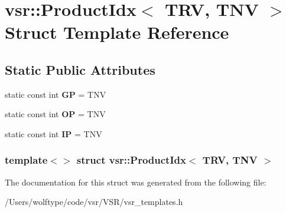\hypertarget{structvsr_1_1_product_idx_3_01_t_r_v_00_01_t_n_v_01_4}{\section{vsr\-:\-:Product\-Idx$<$ T\-R\-V, T\-N\-V $>$ Struct Template Reference}
\label{structvsr_1_1_product_idx_3_01_t_r_v_00_01_t_n_v_01_4}
}
\subsection*{Static Public Attributes}
\begin{DoxyCompactItemize}
\item 
\hypertarget{structvsr_1_1_product_idx_3_01_t_r_v_00_01_t_n_v_01_4_ae51249e14eb79ec897da5a1bd312f843}{static const int {\bfseries G\-P} = T\-N\-V}\label{structvsr_1_1_product_idx_3_01_t_r_v_00_01_t_n_v_01_4_ae51249e14eb79ec897da5a1bd312f843}

\item 
\hypertarget{structvsr_1_1_product_idx_3_01_t_r_v_00_01_t_n_v_01_4_a3d3c4e74a062a95bbeb7080dc2f8233b}{static const int {\bfseries O\-P} = T\-N\-V}\label{structvsr_1_1_product_idx_3_01_t_r_v_00_01_t_n_v_01_4_a3d3c4e74a062a95bbeb7080dc2f8233b}

\item 
\hypertarget{structvsr_1_1_product_idx_3_01_t_r_v_00_01_t_n_v_01_4_a640c832cd0d8b644246a61da6ae26fed}{static const int {\bfseries I\-P} = T\-N\-V}\label{structvsr_1_1_product_idx_3_01_t_r_v_00_01_t_n_v_01_4_a640c832cd0d8b644246a61da6ae26fed}

\end{DoxyCompactItemize}
\subsubsection*{template$<$$>$ struct vsr\-::\-Product\-Idx$<$ T\-R\-V, T\-N\-V $>$}



The documentation for this struct was generated from the following file\-:\begin{DoxyCompactItemize}
\item 
/\-Users/wolftype/code/vsr/\-V\-S\-R/vsr\-\_\-templates.\-h\end{DoxyCompactItemize}
